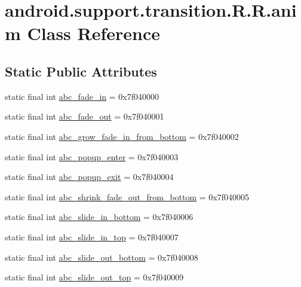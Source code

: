 \hypertarget{classandroid_1_1support_1_1transition_1_1_r_1_1anim}{
\section{android.support.transition.R.R.anim Class Reference}
\label{classandroid_1_1support_1_1transition_1_1_r_1_1anim}
}
\subsection*{Static Public Attributes}
\begin{CompactItemize}
\item 
static final int \hyperlink{classandroid_1_1support_1_1transition_1_1_r_1_1anim_3b8ae234c9fbd06f16796d058de1eeb4}{abc\_\-fade\_\-in} = 0x7f040000
\item 
static final int \hyperlink{classandroid_1_1support_1_1transition_1_1_r_1_1anim_450c5e272a22c653d9d268baea3cd9ac}{abc\_\-fade\_\-out} = 0x7f040001
\item 
static final int \hyperlink{classandroid_1_1support_1_1transition_1_1_r_1_1anim_136cefce3ed4d59089d6ed7ee4d4d3c5}{abc\_\-grow\_\-fade\_\-in\_\-from\_\-bottom} = 0x7f040002
\item 
static final int \hyperlink{classandroid_1_1support_1_1transition_1_1_r_1_1anim_fc6bf81b3e7b4c875738a6c39d1cd4c3}{abc\_\-popup\_\-enter} = 0x7f040003
\item 
static final int \hyperlink{classandroid_1_1support_1_1transition_1_1_r_1_1anim_923620b48a44664f7870ecf6796086e9}{abc\_\-popup\_\-exit} = 0x7f040004
\item 
static final int \hyperlink{classandroid_1_1support_1_1transition_1_1_r_1_1anim_0b3065be195cae81b65d4cac09855559}{abc\_\-shrink\_\-fade\_\-out\_\-from\_\-bottom} = 0x7f040005
\item 
static final int \hyperlink{classandroid_1_1support_1_1transition_1_1_r_1_1anim_7de2127fc9868eb347fad0df3e8c4f11}{abc\_\-slide\_\-in\_\-bottom} = 0x7f040006
\item 
static final int \hyperlink{classandroid_1_1support_1_1transition_1_1_r_1_1anim_63f7b0ee949366e7e7c218f8768de83b}{abc\_\-slide\_\-in\_\-top} = 0x7f040007
\item 
static final int \hyperlink{classandroid_1_1support_1_1transition_1_1_r_1_1anim_94ce6ebb70168768dab07b156658f388}{abc\_\-slide\_\-out\_\-bottom} = 0x7f040008
\item 
static final int \hyperlink{classandroid_1_1support_1_1transition_1_1_r_1_1anim_ea633de990ae53783df64624c0a0f02e}{abc\_\-slide\_\-out\_\-top} = 0x7f040009

\end{CompactItemize}

